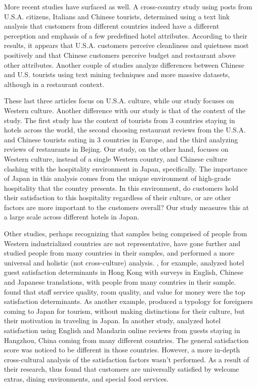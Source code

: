 \documentclass[smallextended,natbib]{svjour3}       %
\begin{document}
    More recent studies have surfaced as well. A cross-country study \cite{FRANCESCO201924} using posts from U.S.A. citizens, Italians and Chinese tourists, determined using a text link analysis that customers from different countries indeed have a different perception and emphasis of a few predefined hotel attributes. According to their results, it appears that U.S.A. customers perceive cleanliness and quietness most positively and that Chinese customers perceive budget and restaurant above other attributes. Another couple of studies \cite{JIA2020104071, HUANG2017117} analyze differences between Chinese and U.S. tourists using text mining techniques and more massive datasets, although in a restaurant context. 

    These last three articles focus on U.S.A. culture, while our study focuses on Western culture. Another difference with our study is that of the context of the study. The first study \cite{FRANCESCO201924} has the context of tourists from 3 countries staying in hotels across the world, the second choosing restaurant reviews from the U.S.A. and Chinese tourists eating in 3 countries in Europe, and the third analyzing reviews of restaurants in Bejing. Our study, on the other hand, focuses on Western culture, instead of a single Western country, and Chinese culture clashing with the hospitality environment in Japan, specifically. The importance of Japan in this analysis comes from the unique environment of high-grade hospitality that the country presents. In this environment, do customers hold their satisfaction to this hospitality regardless of their culture, or are other factors are more important to the customers overall? Our study measures this at a large scale across different hotels in Japan. 

    Other studies, perhaps recognizing that samples being comprised of people from Western industrialized countries are not representative, have gone further and studied people from many countries in their samples, and performed a more universal and holistic (not cross-culture) analysis. \cite{choi2001}, for example, analyzed hotel guest satisfaction determinants in Hong Kong with surveys in English, Chinese and Japanese translations, with people from many countries in their sample. \cite{choi2001} found that staff service quality, room quality, and value for money were the top satisfaction determinants. As another example, \cite{Uzama2012} produced a typology for foreigners coming to Japan for tourism, without making distinctions for their culture, but their motivation in traveling in Japan. In another study, \cite{zhou2014} analyzed hotel satisfaction using English and Mandarin online reviews from guests staying in Hangzhou, China coming from many different countries. The general satisfaction score was noticed to be different in those countries. However, a more in-depth cross-cultural analysis of the satisfaction factors wasn't performed. As a result of their research, \cite{zhou2014} thus found that customers are universally satisfied by welcome extras, dining environments, and special food services. 
\end{document}
